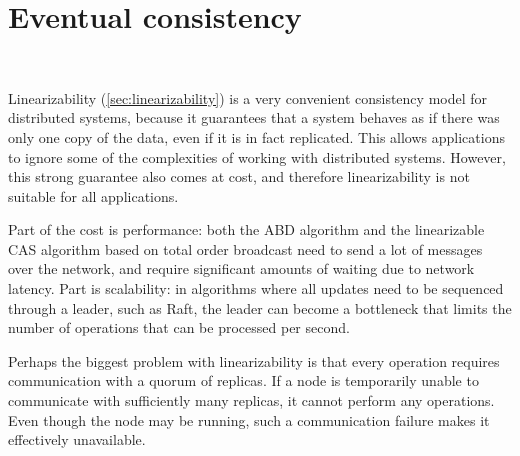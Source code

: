 \section{Eventual consistency}\label{sec:eventual-consistency}

\begin{frame}
    \begin{center}
        {\Large{\color{tumblue}{Eventual Consistency}}} \\[2em]
        \mydetails
    \end{center}
\end{frame}

Linearizability (\autoref{sec:linearizability}) is a very convenient consistency model for distributed systems, because it guarantees that a system behaves as if there was only one copy of the data, even if it is in fact replicated.
This allows applications to ignore some of the complexities of working with distributed systems.
However, this strong guarantee also comes at cost, and therefore linearizability is not suitable for all applications.

Part of the cost is performance: both the ABD algorithm and the linearizable CAS algorithm based on total order broadcast need to send a lot of messages over the network, and require significant amounts of waiting due to network latency.
Part is scalability: in algorithms where all updates need to be sequenced through a leader, such as Raft, the leader can become a bottleneck that limits the number of operations that can be processed per second.

Perhaps the biggest problem with linearizability is that every operation requires communication with a quorum of replicas.
If a node is temporarily unable to communicate with sufficiently many replicas, it cannot perform any operations.
Even though the node may be running, such a communication failure makes it effectively unavailable.

